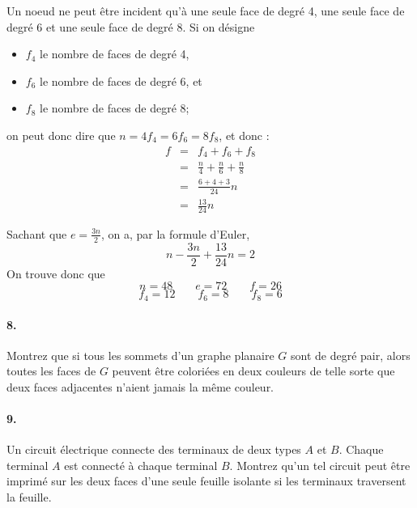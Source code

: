 \begin{solution} Un noeud ne peut être incident qu'à une seule face de degré 4, une seule face de degré 6 et une seule face de degré 8. Si on désigne
\begin{itemize}
\item $f_4$ le nombre de faces de degré 4,
\item $f_6$ le nombre de faces de degré 6, et
\item $f_8$ le nombre de faces de degré 8;
\end{itemize}
on peut donc dire que $n = 4f_4 = 6f_6 = 8f_8$, et donc : 
\[  
\begin{array}{rcl}
f &=& f_4 + f_6 + f_8 \\
  &=& \frac{n}{4} + \frac{n}{6} + \frac{n}{8} \\
  &=& \frac{6 + 4 + 3}{24} n \\
  &=& \frac{13}{24} n 
\end{array}
\]

Sachant que $e = \frac{3n}{2}$, on a, par la formule d'Euler, $$ n - \frac{3n}{2} + \frac{13}{24} n = 2 $$
On trouve donc que $$ n = 48 \qquad e = 72 \qquad f = 26$$
$$ f_4 = 12 \qquad f_6 = 8 \qquad f_8 = 6$$
\end{solution}
\paragraph{8. }Montrez que si tous les sommets d’un graphe planaire $G$ sont de degré pair, alors toutes les faces de $G$ peuvent être coloriées en deux couleurs de telle sorte que deux faces adjacentes n’aient jamais la même couleur.

\paragraph{9. } Un circuit électrique connecte des terminaux de deux types $A$ et $B$. Chaque terminal $A$ est connecté à chaque terminal $B$. Montrez qu’un tel circuit peut être imprimé sur les deux faces d’une seule feuille isolante si les terminaux traversent la feuille.
